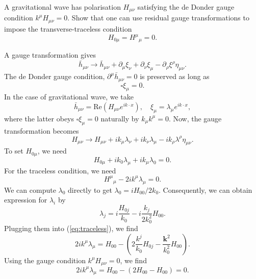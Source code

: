 A gravitational wave has polarisation $H_{\mu\nu}$ satisfying the de Donder gauge condition $k^\mu H_{\mu\nu} = 0$. Show that one can use residual gauge transformations to impose the transverse-traceless condition
\begin{equation}
    H_{0\mu} = H^\mu{}_\mu = 0.
\end{equation}
\begin{solution}
    A gauge transformation gives
    \begin{equation}
        \bar h_{\mu\nu} \to \bar h_{\mu\nu} + \partial _\mu \xi _\nu + \partial_\nu \xi _\mu - \partial_\rho \xi ^\rho \eta_{\mu\nu}.
    \end{equation}
    The de Donder gauge condition, $\partial^\mu \bar h_{\mu\nu} = 0$ is preserved as long as 
    \begin{equation}
        \square\xi_\mu = 0.
    \end{equation}
    In the case of gravitational wave, we take
    \begin{equation}
        \bar h_{\mu\nu} = \text{Re}(H_{\mu\nu}e^{ik\cdot x}),\quad \xi_\mu = \lambda_\mu e^{ik \cdot x},
    \end{equation}
    where the latter obeys $\square\xi_\mu = 0$ naturally by $k_\mu k^\mu = 0$. Now, the gauge transformation becomes
    \begin{equation}
        H_{\mu\nu} \to H_{\mu\nu} + ik_\mu \lambda_\nu + i k_\nu \lambda_\mu - i k_\rho \lambda^\rho \eta_{\mu\nu}.
    \end{equation}
    To set $H_{0\mu}$, we need
    \begin{equation}
        H_{0\mu} + i k_0 \lambda_\mu + ik_\mu \lambda_0 = 0. 
    \end{equation}
    For the traceless condition, we need
    \begin{equation}
        H^\mu {}_\mu - 2ik^\mu \lambda_\mu =0.
        \label{eq:traceless}
    \end{equation}
    We can compute $\lambda_0$ directly  to get $\lambda_0 = iH_{00}/2k_0$. Consequently, we can obtain expression for $\lambda_i$ by
    \begin{equation}
        \lambda_j = i\frac{H_{0j}}{k_0} - i\frac{k_j}{2k_0^2}H_{00}.
    \end{equation}
    Plugging them into (\ref{eq:traceless}), we find
    \begin{equation}
        2ik^\mu \lambda_\mu  = H_{00} -\left(2\frac{k^j}{k_0}H_{0j} - \frac{\mathbf{k}^2}{k_0^2}H_{00}\right).
    \end{equation}
    Using the gauge condition $k^\mu H_{\mu\nu} = 0$, we find
    \begin{equation}
        2ik^\mu \lambda_\mu = H_{00} - (2H_{00}- H_{00}) = 0.
    \end{equation}
\end{solution}
